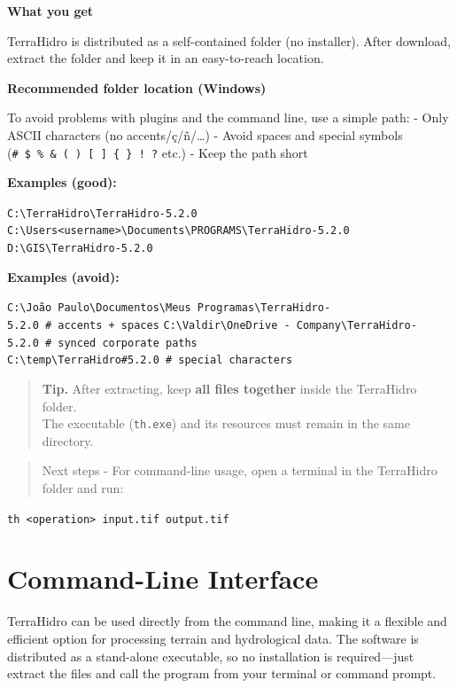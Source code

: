 \documentclass[
]{book}
\begin{document}
\textbf{What you get}

TerraHidro is distributed as a self-contained folder (no installer). After download, extract the folder and keep it in an easy-to-reach location.

\textbf{Recommended folder location (Windows)}

To avoid problems with plugins and the command line, use a simple path:
- Only ASCII characters (no accents/ç/ñ/\ldots)
- Avoid spaces and special symbols (\texttt{\#\ \$\ \%\ \&\ (\ )\ {[}\ {]}\ \{\ \}\ !\ ?} etc.)
- Keep the path short

\textbf{Examples (good):}

\texttt{C:\textbackslash{}TerraHidro\textbackslash{}TerraHidro-5.2.0}
\texttt{C:\textbackslash{}Users\textless{}username\textgreater{}\textbackslash{}Documents\textbackslash{}PROGRAMS\textbackslash{}TerraHidro-5.2.0}
\texttt{D:\textbackslash{}GIS\textbackslash{}TerraHidro-5.2.0}

\textbf{Examples (avoid):}

\texttt{C:\textbackslash{}João\ Paulo\textbackslash{}Documentos\textbackslash{}Meus\ Programas\textbackslash{}TerraHidro-5.2.0\ \#\ accents\ +\ spaces}
\texttt{C:\textbackslash{}Valdir\textbackslash{}OneDrive\ -\ Company\textbackslash{}TerraHidro-5.2.0\ \#\ synced\ corporate\ paths}
\texttt{C:\textbackslash{}temp\textbackslash{}TerraHidro\#5.2.0\ \#\ special\ characters}

\begin{quote}
\textbf{Tip.} After extracting, keep \textbf{all files together} inside the TerraHidro folder.\\
The executable (\texttt{th.exe}) and its resources must remain in the same directory.
\end{quote}

\begin{quote}
Next steps
- For command-line usage, open a terminal in the TerraHidro folder and run:
\end{quote}

\texttt{th\ \textless{}operation\textgreater{}\ input.tif\ output.tif}

\section*{Command-Line Interface}\label{command-line-interface}

TerraHidro can be used directly from the command line, making it a flexible and efficient option for processing terrain and hydrological data. The software is distributed as a stand-alone executable, so no installation is required---just extract the files and call the program from your terminal or command prompt.
\end{document}
